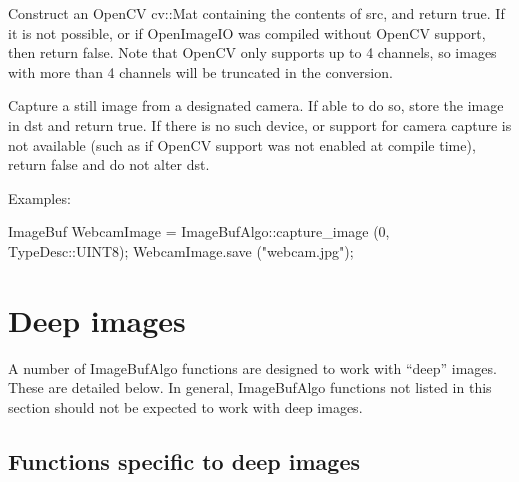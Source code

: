\begin{comment}
\smallskip
\noindent Examples:
\begin{code}
\end{code}
\end{comment}
\apiend


 
Construct an OpenCV {\cf cv::Mat} containing the contents of \ImageBuf src,
and return true. If it is not possible, or if OpenImageIO was compiled
without OpenCV support, then return false. Note that OpenCV only supports up
to 4 channels, so images with more than 4 channels will be truncated in the
conversion.

\begin{comment}
\smallskip
\noindent Examples:
\begin{code}
\end{code}
\end{comment}
\apiend


 
Capture a still image from a designated camera.  If able to do so,
store the image in {\cf dst} and return {\cf true}.  If there is no such device,
or support for camera capture is not available (such as if OpenCV
support was not enabled at compile time), return {\cf false} and do not
alter {\cf dst}.

\smallskip
\noindent Examples:
\begin{code}
    ImageBuf WebcamImage = ImageBufAlgo::capture_image (0, TypeDesc::UINT8);
    WebcamImage.save ("webcam.jpg");
\end{code}
\apiend



\section{Deep images}
\label{sec:iba:deep}

A number of {\cf ImageBufAlgo} functions are designed to work with ``deep''
images. These are detailed below. In general, {\cf ImageBufAlgo} functions
not listed in this section should not be expected to work with deep images.

\subsection{Functions specific to deep images}

